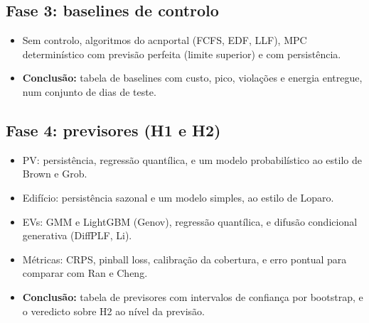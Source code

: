 \documentclass[11pt,a4paper]{article}
\begin{document}
\subsection*{Fase 3: baselines de controlo}
\begin{itemize}
  \item Sem controlo, algoritmos do acnportal (FCFS, EDF, LLF), MPC determinístico com previsão perfeita (limite superior) e com persistência.
  \item \textbf{Conclusão:} tabela de baselines com custo, pico, violações e energia entregue, num conjunto de dias de teste.
\end{itemize}

\subsection*{Fase 4: previsores (H1 e H2)}
\begin{itemize}
  \item PV: persistência, regressão quantílica, e um modelo probabilístico ao estilo de Brown e Grob.
  \item Edifício: persistência sazonal e um modelo simples, ao estilo de Loparo.
  \item EVs: GMM e LightGBM (Genov), regressão quantílica, e difusão condicional generativa (DiffPLF, Li).
  \item Métricas: CRPS, pinball loss, calibração da cobertura, e erro pontual para comparar com Ran e Cheng.
  \item \textbf{Conclusão:} tabela de previsores com intervalos de confiança por bootstrap, e o veredicto sobre H2 ao nível da previsão.
\end{itemize}
\end{document}
